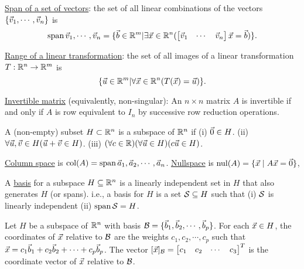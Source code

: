 \documentclass[10pt,a4paper]{article}
\begin{document}
\underline{Span of a set of vectors}: the set of all linear combinations of the vectors $\{\vec{v}_1,\cdots,\vec{v}_n\}$ is 
$$\text{span}\,\vec{v}_1, \cdots, \vec{v}_n = \{ \vec{b}\in \mathbb{R}^m | \exists \vec{x}\in \mathbb{R}^n ( \begin{bmatrix} \vec{v}_1 & \cdots & \vec{v}_n \end{bmatrix} \vec{x} = \vec{b} ) \}.$$

\underline{Range of a linear transformation}: the set of all images of a linear transformation $T:\mathbb{R}^n \rightarrow \mathbb{R}^m$ is
$$\{\vec{u}\in \mathbb{R}^m | \forall \vec{x}\in \mathbb{R}^n(T(\vec{x})=\vec{u})\}. $$

\underline{Invertible matrix} (equivalently, non-singular): An $n\times n$ matrix $A$ is invertible if and only if $A$ is row equivalent to $I_n$ by successive row reduction operations.

\newpage

\begin{definition}
	A (non-empty) subset $H\subset \mathbb{R}^n$ is a subspace of $\mathbb{R}^n$ if
	(i) $\vec{0} \in H$.
	(ii) $\forall \vec{u},\vec{v}\in H(\vec{u}+\vec{v}\in H)$.
	(iii) $(\forall c\in \mathbb{R}) (\forall \vec{u}\in H) (c\vec{u}\in H)$.
\end{definition}
\begin{definition}
	\underline{Column space} is $\text{col}(A) = \text{span}\,\vec{a}_1,\vec{a}_2,\cdots,\vec{a}_n$.
	\underline{Nullspace} is $\text{nul}(A) = \{\vec{x}\mid A\vec{x}=\vec{0}\}$,
\end{definition}



\begin{definition}
	A \underline{basis} for a subspace $H \subseteq \mathbb{R}^n$ is a linearly independent set in $H$ that also generates $H$ (or spans). i.e., a basis for $H$ is a set $\mathcal{S}\subseteq H$ such that (i) $\mathcal{S}$ is linearly independent (ii) $\text{span}\,\mathcal{S} = H$.
\end{definition}

\begin{definition}
	Let $H$ be a subspace of $\mathbb{R}^n$ with basis $\mathcal{B}=\{\vec{b}_1,\vec{b}_2,\cdots,\vec{b}_p\}$. For each $\vec{x}\in H$, the coordinates of $\vec{x}$ relative to $\mathcal{B}$ are the weights $c_1,c_2,\cdots,c_p$ such that $\vec{x} = c_1 \vec{b}_1+c_2 \vec{b}_2 + \cdots + c_p \vec{b}_p$. The vector $[\vec{x}]_{\mathcal{B}} = \begin{bmatrix}c_1 &c_2 &\cdots &c_3\end{bmatrix}^T$ is the coordinate vector of $\vec{x}$ relative to $\mathcal{B}$.
\end{definition}
\end{document}
